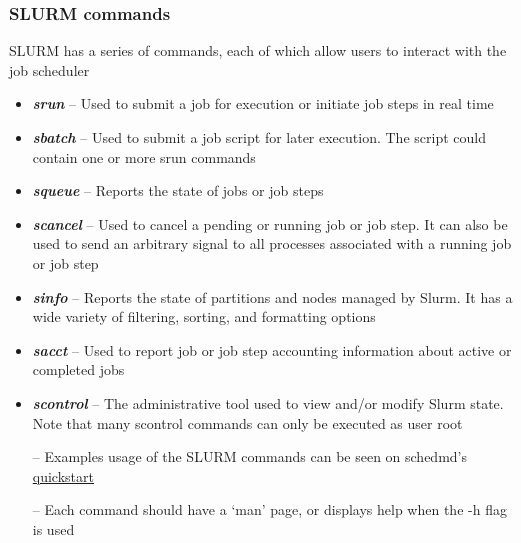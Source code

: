 \begin{frame}
\frametitle{SLURM commands}\footnotesize
SLURM has a series of commands, each of which allow users to interact with the job scheduler
\begin{itemize}\tiny
	\item \emph{\textbf{srun}} --  Used to submit a job for execution or initiate job steps in real time
	\item \emph{\textbf{sbatch}} -- Used to submit a job script for later execution. The script could contain one or more srun commands
	\item \emph{\textbf{squeue}} -- Reports the state of jobs or job steps
	\item \emph{\textbf{scancel}} -- Used to cancel a pending or running job or job step. It can also be used to send an arbitrary signal to all processes associated with a running job or job step
	\item \emph{\textbf{sinfo}} -- Reports the state of partitions and nodes managed by Slurm. It has a wide variety of filtering, sorting, and formatting options
	\item \emph{\textbf{sacct}} -- Used to report job or job step accounting information about active or completed jobs
	\item \emph{\textbf{scontrol}} -- The administrative tool used to view and/or modify Slurm state. Note that many scontrol commands can only be executed as user root
\end{itemize}
\begin{itemize}
	\item[--] Examples usage of the SLURM commands can be seen on schedmd's \href{http://slurm.schedmd.com/quickstart.html}{quickstart}
	\item[--] Each command should have a `man' page, or displays help when the -h flag is used
\end{itemize}
\end{frame}


